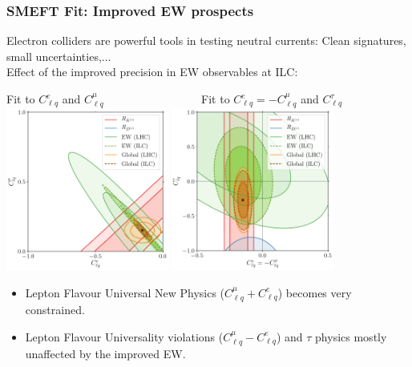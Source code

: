\documentclass[mathserif, 10pt, dvipsnames]{beamer}
\begin{document}
\begin{frame}\frametitle{SMEFT Fit: Improved EW prospects}
Electron colliders are powerful tools in testing neutral currents:
Clean signatures, small uncertainties,...\\[0.1em]
Effect of the improved precision in EW observables at ILC:
    \begin{center}
{\footnotesize Fit to $C_{\ell q}^e$ and $C_{\ell q}^\mu$ $\qquad\qquad\qquad   \qquad$ Fit to $C_{\ell q}^e = -C_{\ell q}^\mu$ and $C_{\ell q}^\tau$}
\includegraphics[width=0.40\textwidth]{figures/scIV_ILC.pdf}
\includegraphics[width=0.40\textwidth]{figures/scXI_ILC.pdf}
    \end{center}

\begin{itemize}
    \item Lepton Flavour Universal New Physics ($C_{\ell q}^\mu+C_{\ell q}^e$) becomes very constrained.
    \item Lepton Flavour Universality violations ($C_{\ell q}^\mu-C_{\ell q}^e$) and $\tau$ physics mostly unaffected by the improved EW.
\end{itemize}

\end{frame}
\end{document}
